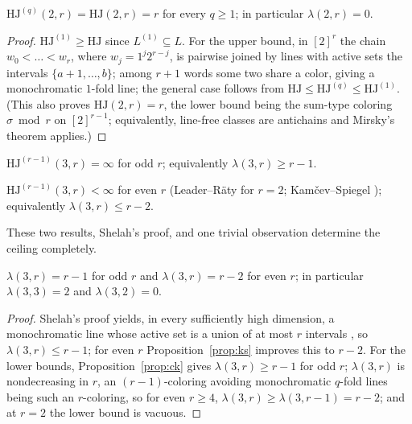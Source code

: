 \documentclass[12pt]{article}
\newcommand{\HJ}{\mathrm{HJ}}
\newcommand{\Ls}{L}
\begin{document}
\begin{proposition}\label{prop:small-interval}
$\HJ^{(q)}(2,r)=\HJ(2,r)=r$ for every $q\ge 1$; in particular
$\lambda(2,r)=0$.
\end{proposition}

\begin{proof}
$\HJ^{(1)}\ge\HJ$ since $\Ls^{(1)}\subseteq\Ls$. For the upper bound,
in $[2]^{r}$ the chain $w_{0}<\dots<w_{r}$, where $w_{j}=1^{j}2^{r-j}$,
is pairwise joined by lines with active sets the intervals
$\{a{+}1,\dots,b\}$; among $r+1$ words some two share a color, giving a
monochromatic $1$-fold line; the general case follows from
$\HJ\le\HJ^{(q)}\le\HJ^{(1)}$. (This also proves $\HJ(2,r)=r$, the
lower bound being the sum-type coloring $\sigma\bmod r$ on
$[2]^{r-1}$; equivalently, line-free classes are antichains and
Mirsky's theorem \cite{Mirsky1971} applies.)
\end{proof}

\begin{proposition}\label{prop:ck}
$\HJ^{(r-1)}(3,r)=\infty$ for odd $r$; equivalently
$\lambda(3,r)\ge r-1$.
\end{proposition}

\begin{proposition}\label{prop:ks}
$\HJ^{(r-1)}(3,r)<\infty$ for even $r$ \textup{(}Leader--R\"aty
\cite{leader2018noteintervalshalesjewetttheorem} for $r=2$;
Kam\v{c}ev--Spiegel \cite{kamcev2018noteintervalshalesjewetttheorem}\textup{)};
equivalently $\lambda(3,r)\le r-2$.
\end{proposition}

These two results, Shelah's proof, and one trivial observation
determine the ceiling completely.

\begin{proposition}\label{prop:lambda3}
$\lambda(3,r)=r-1$ for odd $r$ and $\lambda(3,r)=r-2$ for even $r$; in
particular $\lambda(3,3)=2$ and $\lambda(3,2)=0$.
\end{proposition}

\begin{proof}
Shelah's proof yields, in every sufficiently high dimension, a
monochromatic line whose active set is a union of at most $r$ intervals
\cite{s.proof_of_HJ,conlonAndKamcev}, so $\lambda(3,r)\le r-1$; for
even $r$ Proposition~\ref{prop:ks} improves this to $r-2$. For the
lower bounds, Proposition~\ref{prop:ck} gives $\lambda(3,r)\ge r-1$ for
odd $r$; $\lambda(3,r)$ is nondecreasing in $r$, an $(r-1)$-coloring
avoiding monochromatic $q$-fold lines being such an $r$-coloring, so
for even $r\ge 4$, $\lambda(3,r)\ge\lambda(3,r-1)=r-2$; and at $r=2$
the lower bound is vacuous.
\end{proof}
\end{document}
